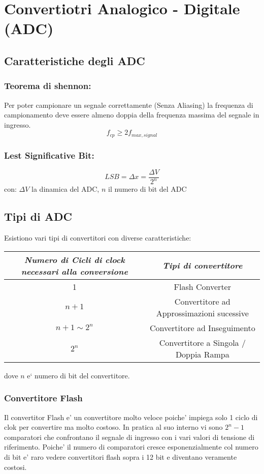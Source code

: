 \documentclass[\main/main.tex]{subfiles}
\begin{document}
\clearpage
\section{Convertiotri Analogico - Digitale (ADC)}
\subsection{Caratteristiche degli ADC}

\subsubsection{Teorema di shennon:}
Per poter campionare un segnale correttamente (Senza Aliasing) la frequenza di campionamento deve essere almeno doppia della frequenza massima del segnale in ingresso.
\[f_{cp} \ge 2 f_{max,signal}\]

\subsubsection{Lest Significative Bit:}
\[LSB = \Delta x = \frac{\Delta V}{2^n} \]
con:
$\Delta V$ la dinamica del ADC,
 $n$ il numero di bit del ADC
\subsection{Tipi di ADC}

 Esistiono vari tipi di convertitori con diverse caratteristiche:
\begin{center}
 \begin{tabular}{| c | c |}
 \hline
 \textit{Numero di Cicli di clock necessari alla conversione} & \textit{Tipi di convertitore}\\
 \hline
 1 & Flash Converter\\
 \hline
 $n+1$ & Convertitore ad Approssimazioni sucessive\\
 \hline
 $n+1 \sim 2^n$ & Convertitore ad Inseguimento\\
 \hline
 $2^n$ & Convertitore a Singola / Doppia Rampa\\
 \hline
 \end{tabular}
\end{center}
dove $n$  e` numero di bit del convertitore.

\subsubsection{Convertitore Flash}
Il convertitor Flash e' un convertitore molto veloce poiche' impiega solo 1 ciclo di clok per convertire ma molto costoso.
In pratica al suo interno vi sono $2^n - 1$ comparatori che confrontano il segnale di ingresso con i vari valori di tensione di riferimento.
Poiche' il numero di comparatori cresce esponenzialmente col numero di bit e' raro vedere convertitori flash sopra i 12 bit e diventano veramente costosi.
\end{document}
